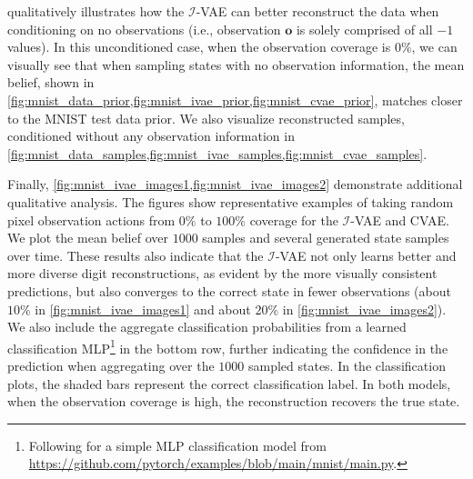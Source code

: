 qualitatively illustrates how the $\mathcal{I}$-VAE can better reconstruct the data when conditioning on no observations (i.e., observation $\mathbf{o}$ is solely comprised of all $-1$ values).
In this unconditioned case, when the observation coverage is $0\%$, we can visually see that when sampling states with no observation information, the mean belief, shown in \cref{fig:mnist_data_prior,fig:mnist_ivae_prior,fig:mnist_cvae_prior}, matches closer to the MNIST test data prior.
We also visualize reconstructed samples, conditioned without any observation information in \cref{fig:mnist_data_samples,fig:mnist_ivae_samples,fig:mnist_cvae_samples}.

Finally, \cref{fig:mnist_ivae_images1,fig:mnist_ivae_images2} demonstrate additional qualitative analysis.
The figures show representative examples of taking random pixel observation actions from $0\%$ to $100\%$ coverage for the $\mathcal{I}$-VAE and CVAE.
We plot the mean belief over $1000$ samples and several generated state samples over time.
These results also indicate that the $\mathcal{I}$-VAE not only learns better and more diverse digit reconstructions, as evident by the more visually consistent predictions, but also converges to the correct state in fewer observations (about $10\%$ in \cref{fig:mnist_ivae_images1} and about $20\%$ in \cref{fig:mnist_ivae_images2}).
We also include the aggregate classification probabilities from a learned classification MLP\footnote{Following \textcite{imambi2021pytorch} for a simple MLP classification model from \url{https://github.com/pytorch/examples/blob/main/mnist/main.py}.} in the bottom row, further indicating the confidence in the prediction when aggregating over the $1000$ sampled states.
In the classification plots, the shaded bars represent the correct classification label.
In both models, when the observation coverage is high, the reconstruction recovers the true state.

